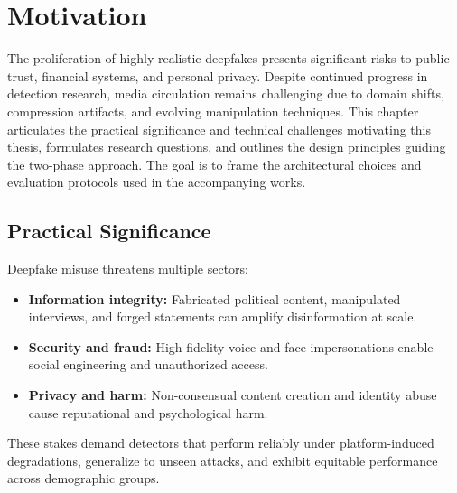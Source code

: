 \chapter{Motivation}
The proliferation of highly realistic deepfakes presents significant risks to public trust, financial systems, and personal privacy. Despite continued progress in detection research, media circulation remains challenging due to domain shifts, compression artifacts, and evolving manipulation techniques. This chapter articulates the practical significance and technical challenges motivating this thesis, formulates research questions, and outlines the design principles guiding the two-phase approach. The goal is to frame the architectural choices and evaluation protocols used in the accompanying works.

\section{Practical Significance}
Deepfake misuse threatens multiple sectors:
\begin{itemize}
    \item \textbf{Information integrity:} Fabricated political content, manipulated interviews, and forged statements can amplify disinformation at scale.
    \item \textbf{Security and fraud:} High-fidelity voice and face impersonations enable social engineering and unauthorized access.
    \item \textbf{Privacy and harm:} Non-consensual content creation and identity abuse cause reputational and psychological harm.
\end{itemize}
These stakes demand detectors that perform reliably under platform-induced degradations, generalize to unseen attacks, and exhibit equitable performance across demographic groups.

